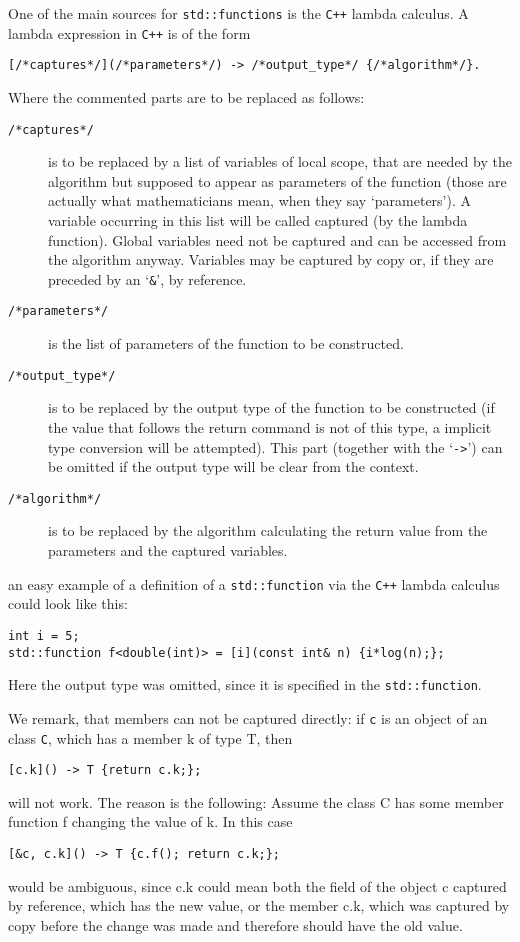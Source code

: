 \documentclass{article}
\newcommand{\cc}{\texttt{C++}\xspace}
\begin{document}
One of the main sources for \texttt{std::functions} is the \cc lambda calculus. A lambda expression in \cc is of the form
\begin{lstlisting}
[/*captures*/](/*parameters*/) -> /*output_type*/ {/*algorithm*/}.
\end{lstlisting}
Where the commented parts are to be replaced as follows:
\begin{description}
\item[\texttt{/*captures*/}] is to be replaced by a list of variables of local scope, that are needed by the algorithm but supposed to appear as parameters of the function (those are actually what mathematicians mean, when they say \lq parameters\rq). A variable occurring in this list will be called captured (by the lambda function). Global variables need not be captured and can be accessed from the algorithm anyway. Variables may be captured by copy or, if they are preceded by an \lq\texttt{\&}\rq, by reference.
\item[\texttt{/*parameters*/}] is the list of parameters of the function to be constructed.
\item[\texttt{/*output\_type*/}] is to be replaced by the output type of the function to be constructed (if the value that follows the return command is not of this type, a implicit type conversion will be attempted). This part (together with the \lq\texttt{->}\rq) can be omitted if the output type will be clear from the context.
\item[\texttt{/*algorithm*/}] is to be replaced by the algorithm calculating the return value from the parameters and the captured variables.
\end{description}
an easy example of a definition of a \texttt{std::function} via the \cc lambda calculus could look like this:
\begin{lstlisting}
int i = 5;
std::function f<double(int)> = [i](const int& n) {i*log(n);};
\end{lstlisting}
Here the output type was omitted, since it is specified in the \texttt{std::function}.

We remark, that members can not be captured directly: if \texttt c is an object of an class \texttt C, which has a member k of type T, then
\begin{lstlisting}
[c.k]() -> T {return c.k;};
\end{lstlisting}
will not work. The reason is the following: Assume the class C has some member function f changing the value of k. In this case
\begin{lstlisting}
[&c, c.k]() -> T {c.f(); return c.k;};
\end{lstlisting}
would be ambiguous, since c.k could mean both the field of the object c captured by reference, which has the new value, or the member c.k, which was captured by copy before the change was made and therefore should have the old value.
\end{document}
